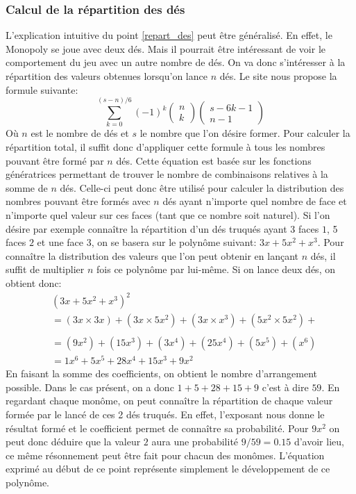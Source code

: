 \documentclass[letterpaper]{article}
\begin{document}
    \subsubsection{Calcul de la répartition des dés}
      L'explication intuitive du point \ref{repart_des} peut être généralisé.
      En effet, le Monopoly se joue avec deux dés.  Mais il pourrait être
      intéressant de voir le comportement du jeu avec un autre nombre de dés.
      On va donc s'intéresser à la répartition des valeurs obtenues lorsqu'on 
      lance $n$ dés.  Le site \cite{FORMULE_Des} nous propose la formule 
      suivante:
      $$\sum\limits_{k=0}^{(s-n)/6} (-1)^k \begin{pmatrix}n \\ k\end{pmatrix} 
	\begin{pmatrix}s-6k-1 \\n-1\end{pmatrix}$$
      Où $n$ est le nombre de dés et $s$ le nombre que l'on désire former.
      Pour calculer la répartition total, il suffit donc d'appliquer cette
      formule à tous les nombres pouvant être formé par $n$ dés.
      Cette équation est basée sur les fonctions génératrices permettant de
      trouver le nombre de combinaisons relatives à la somme de $n$ dés.
      Celle-ci peut donc être utilisé pour calculer la distribution
      des nombres pouvant être formés avec $n$ dés ayant n'importe quel 
      nombre de face et n'importe quel valeur sur ces faces (tant que ce 
      nombre soit naturel).
      Si l'on désire par exemple connaître la répartition d'un dés truqués 
      ayant 3 faces $1$, 5 faces $2$ et une face $3$, on se basera sur le 
      polynôme suivant: $3x + 5x^2 + x^3$.  Pour connaître la distribution 
      des valeurs que l'on peut obtenir en lançant $n$ dés, il suffit de 
      multiplier $n$ fois ce polynôme par lui-même.  Si on lance deux dés,
      on obtient donc:
      \begin{align*}
      &(3x + 5x^2 + x^3)^2\\
      &= (3x \times 3x) + (3x \times 5x^2) + (3x \times x^3) + (5x^2 \times 5x^2) + \\
      \tag*{$(5x^2 \times x^3) + (x^3 \times x^3)$}\\
      &= (9x^2) + (15x^3) + (3x^4) + (25x^4) + (5x^5) + (x^6)\\
      &= 1 x^6 + 5x^5 + 28x^4 + 15x^3 + 9x^2
      \end{align*}
      En faisant la somme des coefficients, on obtient le nombre d'arrangement 
      possible.  Dans le cas présent, on a donc $1 + 5 + 28 + 15 + 9$ c'est à 
      dire $59$.  En regardant chaque monôme, on peut connaître la répartition
      de chaque valeur formée par le lancé de ces 2 dés truqués.  En effet, 
      l'exposant nous donne le résultat formé et le coefficient permet de 
      connaître sa probabilité.  Pour $9 x^2$ on peut donc déduire que la 
      valeur $2$ aura une probabilité $9/59 = 0.15$ d'avoir lieu, ce même
      résonnement peut être fait pour chacun des monômes.
      L'équation exprimé au début de ce point représente simplement le 
      développement de ce polynôme.
    
\end{document}
